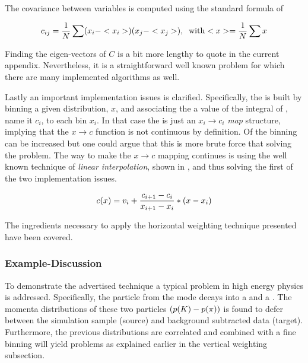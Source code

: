 \noindent The covariance between variables is computed using the standard formula of 

\begin{equation}
\centering
c_{ij} = \frac{1}{N} \sum (x_i-<x_i>)(x_j-<x_j>), \;\; \text {with} <x> = \frac{1}{N} \sum x \nonumber
\label{hor_reww_correlation_formula}
\end{equation}

\noindent Finding the eigen-vectors of $C$ is a bit more lengthy to quote in the current appendix.
Nevertheless, it is a straightforward well known problem for which there are many implemented
algorithms as well.

Lastly an important implementation issues is clarified. Specifically, the \cdf is built by binning a
given distribution, $x$, and associating the a value of the integral of , name it $c_i$,
to each bin $x_i$. In that case  the \cdf is just an $x_i \to c_i$ {\it map}
structure, implying that the $x \to c$ function is not continuous by definition. Of the binning can be increased
but one could argue that this is more brute force that solving the problem. The way to make the $x \to c$ mapping
continues is using the well known technique of {\it linear interpolation}, shown in ,
and thus solving the first of the two implementation issues.

\begin{equation}
  c(x) = v_i + \frac{c_{i+1}-c_i}{x_{i+1}-x_i} *  \left( x - x_i \right)
  \label{linear_interpolation}
\end{equation}

The ingredients necessary to apply the horizontal weighting technique presented have been covered.

\subsubsection{Example-Discussion}
To demonstrate the advertised technique a typical problem in high energy physics is addressed.
Specifically, the \Kstarz particle from the \BsJpsiKst mode decays into a \kaon and a \pion. The momenta
distributions of these two particles $\left( \mbox{$p$}(K)-\mbox{$p$}(\pi) \right)$ is found to defer between
the simulation sample (source) and background subtracted data (target).
Furthermore, the previous distributions are correlated and combined with a fine binning will yield problems as explained
earlier in the vertical weighting subsection.

